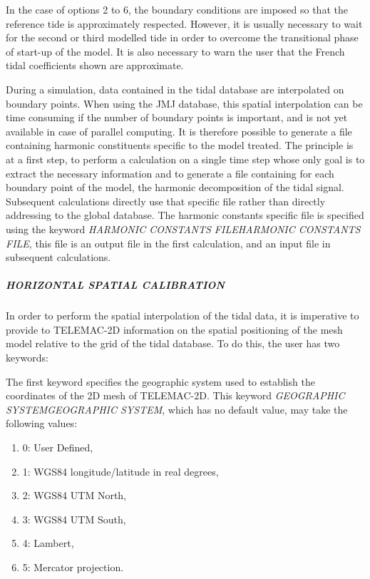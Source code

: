  In the case of options 2 to 6, the boundary conditions are imposed so that the reference tide is approximately respected. However, it is usually necessary to wait for the second or third modelled tide in order to overcome the transitional phase of start-up of the model. It is also necessary to warn the user that the French tidal coefficients shown are approximate.

 During a simulation, data contained in the tidal database are interpolated on boundary points. When using the JMJ database, this spatial interpolation can be time consuming if the number of boundary points is important, and is not yet available in case of parallel computing. It is therefore possible to generate a file containing harmonic constituents specific to the model treated. The principle is at a first step, to perform a calculation on a single time step whose only goal is to extract the necessary information and to generate a file containing for each boundary point of the model, the harmonic decomposition of the tidal signal. Subsequent calculations directly use that specific file rather than directly addressing to the global database. The harmonic constants specific file is specified using the keyword \textit{HARMONIC CONSTANTS FILEHARMONIC CONSTANTS FILE}, this file is an output file in the first calculation, and an input file in subsequent calculations.


\subparagraph{ HORIZONTAL SPATIAL CALIBRATION}

 In order to perform the spatial interpolation of the tidal data, it is imperative to provide to TELEMAC-2D information on the spatial positioning of the mesh model relative to the grid of the tidal database. To do this, the user has two keywords:

 The first keyword specifies the geographic system used to establish the coordinates of the 2D mesh of TELEMAC-2D. This keyword \textit{GEOGRAPHIC SYSTEMGEOGRAPHIC SYSTEM}, which has no default value, may take the following values:

\begin{enumerate}
\item  0: User Defined,

\item  1: WGS84 longitude/latitude in real degrees,

\item  2: WGS84 UTM North,

\item  3: WGS84 UTM South,

\item  4: Lambert,

\item  5: Mercator projection.
\end{enumerate}

